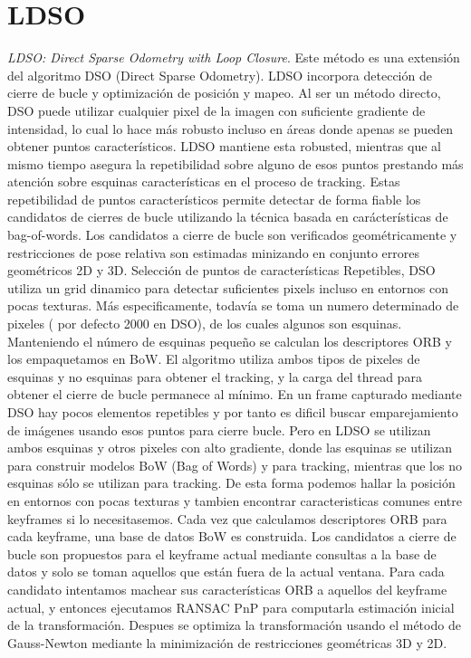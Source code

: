 \section{LDSO}
\textit{LDSO: Direct Sparse Odometry with Loop Closure}. Este método es una extensión del algoritmo DSO (Direct Sparse Odometry). LDSO incorpora detección de cierre de bucle y optimización de posición y mapeo. Al ser un método directo, DSO puede utilizar cualquier pixel de la imagen con suficiente gradiente de intensidad, lo cual lo hace más robusto incluso en áreas donde apenas se pueden obtener puntos característicos. LDSO mantiene esta robusted, mientras que al mismo tiempo asegura la repetibilidad  sobre alguno de esos puntos prestando más atención sobre esquinas características en el proceso de tracking. Estas repetibilidad de puntos característicos permite detectar de forma fiable los candidatos de cierres de bucle utilizando la técnica basada en carácterísticas de bag-of-words. 
Los candidatos a cierre de bucle son verificados geométricamente y restricciones de pose relativa son estimadas minizando en conjunto errores geométricos 2D y 3D.
Selección de puntos de características Repetibles, DSO utiliza un grid dinamico para detectar suficientes pixels incluso en entornos con pocas texturas. Más especificamente, todavía se toma un numero determinado de pixeles ( por defecto 2000 en DSO), de los cuales algunos son esquinas. Manteniendo el número de esquinas pequeño se calculan los descriptores ORB y los empaquetamos en BoW. El algoritmo  utiliza ambos tipos de pixeles de esquinas y no esquinas para obtener el tracking, y la carga del thread para obtener el cierre de bucle permanece al mínimo.
En un frame capturado mediante DSO hay pocos elementos repetibles y por tanto es dificil buscar emparejamiento de imágenes usando esos puntos para cierre bucle. Pero en LDSO se utilizan ambos esquinas y otros pixeles con alto gradiente, donde las esquinas se utilizan para construir modelos BoW (Bag of Words) y para tracking, mientras que los no esquinas sólo se utilizan para tracking. De esta forma podemos hallar la posición en entornos con pocas texturas y tambien encontrar caracteristicas comunes entre keyframes si lo necesitasemos.
Cada vez que calculamos descriptores ORB para cada keyframe, una base de datos BoW es construida. Los candidatos a cierre de bucle son propuestos para el keyframe actual mediante consultas a la base de datos y solo se toman aquellos que están fuera de la actual ventana. Para cada candidato intentamos machear sus características ORB a aquellos del keyframe actual, y entonces ejecutamos RANSAC PnP para computarla estimación inicial de la transformación. Despues se optimiza la transformación usando el método de Gauss-Newton mediante la minimización de restricciones geométricas 3D y 2D.
